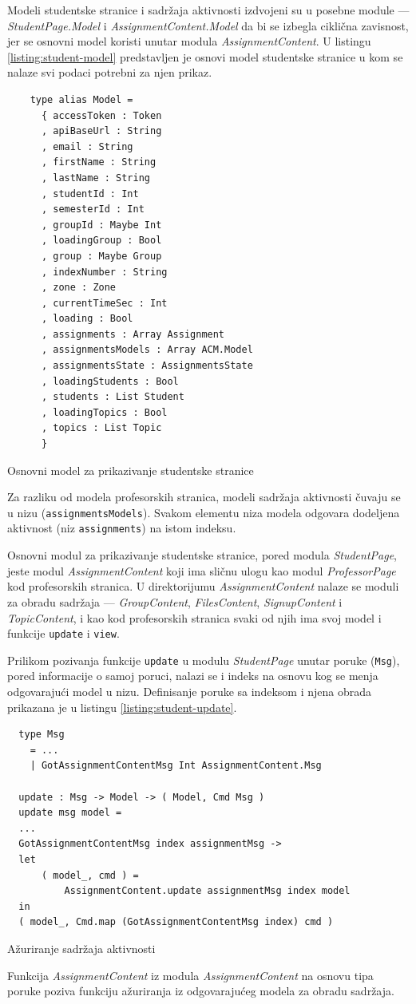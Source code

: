 \documentclass[12pt,oneside]{memoir}
\begin{document}
Modeli studentske stranice i sadržaja aktivnosti izdvojeni su u posebne module --- \emph{StudentPage.Model} i
\emph{AssignmentContent.Model} da bi se izbegla ciklična zavisnost, jer se osnovni model koristi unutar
modula \emph{AssignmentContent}. U listingu \ref{listing:student-model} predstavljen je osnovi model studentske stranice u kom se
nalaze svi podaci potrebni za njen prikaz.
\begin{listing}[h]
\begin{verbatim}
    type alias Model =
      { accessToken : Token
      , apiBaseUrl : String
      , email : String
      , firstName : String
      , lastName : String
      , studentId : Int
      , semesterId : Int
      , groupId : Maybe Int
      , loadingGroup : Bool
      , group : Maybe Group
      , indexNumber : String
      , zone : Zone
      , currentTimeSec : Int
      , loading : Bool
      , assignments : Array Assignment
      , assignmentsModels : Array ACM.Model
      , assignmentsState : AssignmentsState
      , loadingStudents : Bool
      , students : List Student
      , loadingTopics : Bool
      , topics : List Topic
      }
\end{verbatim}
\caption{Osnovni model za prikazivanje studentske stranice}
\label{listing:student-model}
\end{listing}
Za razliku od modela profesorskih stranica, modeli sadržaja aktivnosti čuvaju se u nizu
(\texttt{assignmentsModels}). Svakom elementu niza modela odgovara dodeljena aktivnost (niz \texttt{assignments}) na istom indeksu.

Osnovni modul za prikazivanje studentske stranice, pored modula \emph{StudentPage}, jeste modul
\emph{AssignmentContent} koji ima sličnu ulogu kao modul \emph{ProfessorPage} kod profesorskih
stranica. U direktorijumu \emph{AssignmentContent} nalaze se moduli za obradu sadržaja --- \emph{GroupContent}, \emph{FilesContent},
\emph{SignupContent} i \emph{TopicContent}, i kao kod profesorskih stranica svaki od njih ima svoj
model i funkcije \texttt{update} i \texttt{view}.

Prilikom pozivanja funkcije \texttt{update} u modulu \emph{StudentPage} unutar poruke (\texttt{Msg}), pored informacije o
samoj poruci, nalazi se i indeks na osnovu kog se menja odgovarajući model u nizu. Definisanje poruke sa indeksom i njena
obrada prikazana je u listingu \ref{listing:student-update}.
\begin{listing}[h]
\begin{verbatim}
  type Msg
    = ...
    | GotAssignmentContentMsg Int AssignmentContent.Msg

  update : Msg -> Model -> ( Model, Cmd Msg )
  update msg model =
  ...
  GotAssignmentContentMsg index assignmentMsg ->
  let
      ( model_, cmd ) =
          AssignmentContent.update assignmentMsg index model
  in
  ( model_, Cmd.map (GotAssignmentContentMsg index) cmd )
\end{verbatim}
\caption{Ažuriranje sadržaja aktivnosti}
\label{listing:student-update}
\end{listing}
Funkcija \emph{AssignmentContent} iz modula \emph{AssignmentContent} na osnovu tipa poruke poziva
funkciju ažuriranja iz odgovarajućeg modela za obradu sadržaja.
\end{document}
